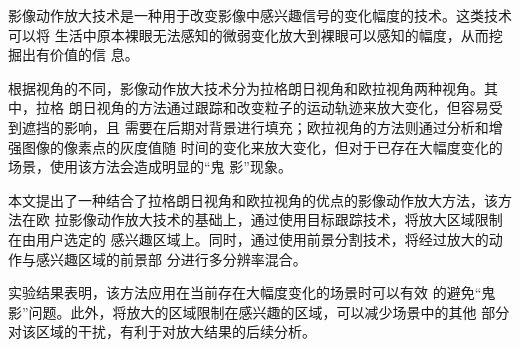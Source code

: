 \begin{cabstract}
  影像动作放大技术是一种用于改变影像中感兴趣信号的变化幅度的技术。这类技术可以将
  生活中原本裸眼无法感知的微弱变化放大到裸眼可以感知的幅度，从而挖掘出有价值的信
  息。

  根据视角的不同，影像动作放大技术分为拉格朗日视角和欧拉视角两种视角。其中，拉格
  朗日视角的方法通过跟踪和改变粒子的运动轨迹来放大变化，但容易受到遮挡的影响，且
  需要在后期对背景进行填充；欧拉视角的方法则通过分析和增强图像的像素点的灰度值随
  时间的变化来放大变化，但对于已存在大幅度变化的场景，使用该方法会造成明显的“鬼
  影”现象。

  本文提出了一种结合了拉格朗日视角和欧拉视角的优点的影像动作放大方法，该方法在欧
  拉影像动作放大技术的基础上，通过使用目标跟踪技术，将放大区域限制在由用户选定的
  感兴趣区域上。同时，通过使用前景分割技术，将经过放大的动作与感兴趣区域的前景部
  分进行多分辨率混合。

  实验结果表明，该方法应用在当前存在大幅度变化的场景时可以有效
  的避免“鬼影”问题。此外，将放大的区域限制在感兴趣的区域，可以减少场景中的其他
  部分对该区域的干扰，有利于对放大结果的后续分析。
  
\end{cabstract}

